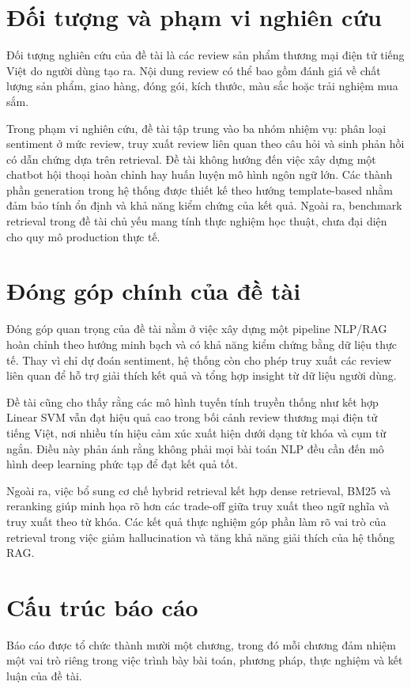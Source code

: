 \section{Đối tượng và phạm vi nghiên cứu}
Đối tượng nghiên cứu của đề tài là các review sản phẩm thương mại điện tử tiếng Việt do người dùng tạo ra. Nội dung review có thể bao gồm đánh giá về chất lượng sản phẩm, giao hàng, đóng gói, kích thước, màu sắc hoặc trải nghiệm mua sắm.

Trong phạm vi nghiên cứu, đề tài tập trung vào ba nhóm nhiệm vụ: phân loại sentiment ở mức review, truy xuất review liên quan theo câu hỏi và sinh phản hồi có dẫn chứng dựa trên retrieval. Đề tài không hướng đến việc xây dựng một chatbot hội thoại hoàn chỉnh hay huấn luyện mô hình ngôn ngữ lớn. Các thành phần generation trong hệ thống được thiết kế theo hướng template-based nhằm đảm bảo tính ổn định và khả năng kiểm chứng của kết quả. Ngoài ra, benchmark retrieval trong đề tài chủ yếu mang tính thực nghiệm học thuật, chưa đại diện cho quy mô production thực tế.

\section{Đóng góp chính của đề tài}
Đóng góp quan trọng của đề tài nằm ở việc xây dựng một pipeline NLP/RAG hoàn chỉnh theo hướng minh bạch và có khả năng kiểm chứng bằng dữ liệu thực tế. Thay vì chỉ dự đoán sentiment, hệ thống còn cho phép truy xuất các review liên quan để hỗ trợ giải thích kết quả và tổng hợp insight từ dữ liệu người dùng.

Đề tài cũng cho thấy rằng các mô hình tuyến tính truyền thống như \TFIDF{} kết hợp Linear SVM vẫn đạt hiệu quả cao trong bối cảnh review thương mại điện tử tiếng Việt, nơi nhiều tín hiệu cảm xúc xuất hiện dưới dạng từ khóa và cụm từ ngắn. Điều này phản ánh rằng không phải mọi bài toán NLP đều cần đến mô hình deep learning phức tạp để đạt kết quả tốt.

Ngoài ra, việc bổ sung cơ chế hybrid retrieval kết hợp dense retrieval, BM25 và reranking giúp minh họa rõ hơn các trade-off giữa truy xuất theo ngữ nghĩa và truy xuất theo từ khóa. Các kết quả thực nghiệm góp phần làm rõ vai trò của retrieval trong việc giảm hallucination và tăng khả năng giải thích của hệ thống RAG.

\section{Cấu trúc báo cáo}
Báo cáo được tổ chức thành mười một chương, trong đó mỗi chương đảm nhiệm một vai trò riêng trong việc trình bày bài toán, phương pháp, thực nghiệm và kết luận của đề tài.

